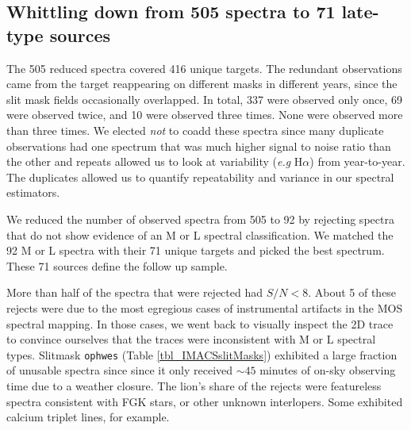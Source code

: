\subsection{ Whittling down from 505 spectra to 71 late-type sources}
The 505 reduced spectra covered 416 unique targets.  The redundant observations came from the target reappearing on different masks in different years, since the slit mask fields occasionally overlapped.  In total, 337 were observed only once, 69 were observed twice, and 10 were observed three times.  None were observed more than three times.  We elected \emph{not} to coadd these spectra since many duplicate observations had one spectrum that was much higher signal to noise ratio than the other and repeats allowed us to look at variability (\emph{e.g} H$\alpha$) from year-to-year.  The duplicates allowed us to quantify repeatability and variance in our spectral estimators.  

We reduced the number of observed spectra from 505 to 92 by rejecting spectra that do not show evidence of an M or L spectral classification.  We matched the 92 M or L spectra with their 71 unique targets and picked the best spectrum.  These 71 sources define the follow up sample.  

More than half of the spectra that were rejected had $S/N < 8$.  About 5 of these rejects were due to the most egregious cases of instrumental artifacts in the MOS spectral mapping.  In those cases, we went back to visually inspect the 2D trace to convince ourselves that the traces were inconsistent with M or L spectral types.  Slitmask \texttt{ophwes} (Table \ref{tbl_IMACSslitMasks}) exhibited a large fraction of unusable spectra since since it only received $\sim45$ minutes of on-sky observing time due to a weather closure.  The lion's share of the rejects were featureless spectra consistent with FGK stars, or other unknown interlopers.  Some exhibited calcium triplet lines, for example.  


